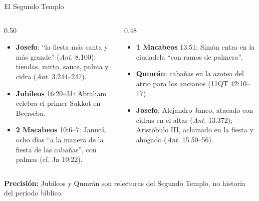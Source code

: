 \documentclass[hyperref={bookmarks=false},aspectratio=169]{beamer}
\newcommand{\precision}[1]{{\footnotesize\color{sepia}\textbf{Precisión:} #1}}
\begin{document}
\begin{frame}{El Segundo Templo}
\begin{columns}[t,onlytextwidth]
\begin{column}{0.50\textwidth}\scriptsize
\begin{itemize}
\item \textbf{Josefo}: ``la fiesta más santa y más grande'' (\emph{Ant.} 8.100); tiendas, mirto, sauce, palma y cidra (\emph{Ant.} 3.244--247).
\item \textbf{Jubileos} 16:20--31: Abraham celebra el primer Sukkot en Beerseba.
\item \textbf{2 Macabeos} 10:6--7: Janucá, ocho días ``a la manera de la fiesta de las cabañas'', con palmas (cf. Jn 10:22).
\end{itemize}
\end{column}
\begin{column}{0.48\textwidth}\scriptsize
\begin{itemize}
\item \textbf{1 Macabeos} 13:51: Simón entra en la ciudadela ``con ramos de palmera''.
\item \textbf{Qumrán}: cabañas en la azotea del atrio para los ancianos (11QT 42:10--17).
\item \textbf{Josefo}: Alejandro Janeo, atacado con cidras en el altar (\emph{Ant.} 13.372); Aristóbulo III, aclamado en la fiesta y ahogado (\emph{Ant.} 15.50--56).
\end{itemize}
\end{column}
\end{columns}\par\medskip
\precision{Jubileos y Qumrán son relecturas del Segundo Templo, no historia del período bíblico.}
\end{frame}
\end{document}
